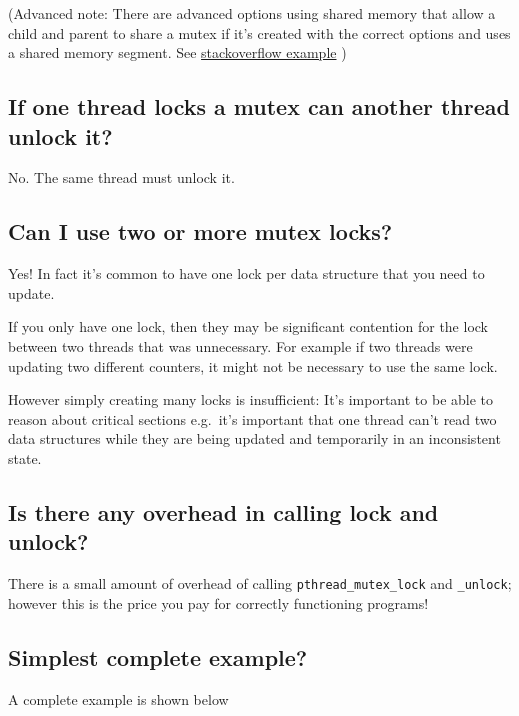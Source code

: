(Advanced note: There are advanced options using shared memory that
allow a child and parent to share a mutex if it's created with the
correct options and uses a shared memory segment. See
\href{http://stackoverflow.com/questions/19172541/procs-fork-and-mutexes}{stackoverflow
example} )

\subsection{If one thread locks a mutex can another thread unlock
it?}\label{if-one-thread-locks-a-mutex-can-another-thread-unlock-it}

No. The same thread must unlock it.

\subsection{Can I use two or more mutex
locks?}\label{can-i-use-two-or-more-mutex-locks}

Yes! In fact it's common to have one lock per data structure that you
need to update.

If you only have one lock, then they may be significant contention for
the lock between two threads that was unnecessary. For example if two
threads were updating two different counters, it might not be necessary
to use the same lock.

However simply creating many locks is insufficient: It's important to be
able to reason about critical sections e.g.~it's important that one
thread can't read two data structures while they are being updated and
temporarily in an inconsistent state.

\subsection{Is there any overhead in calling lock and
unlock?}\label{is-there-any-overhead-in-calling-lock-and-unlock}

There is a small amount of overhead of calling
\texttt{pthread\_mutex\_lock} and \texttt{\_unlock}; however this is the
price you pay for correctly functioning programs!

\subsection{Simplest complete example?}\label{simplest-complete-example}

A complete example is shown below


